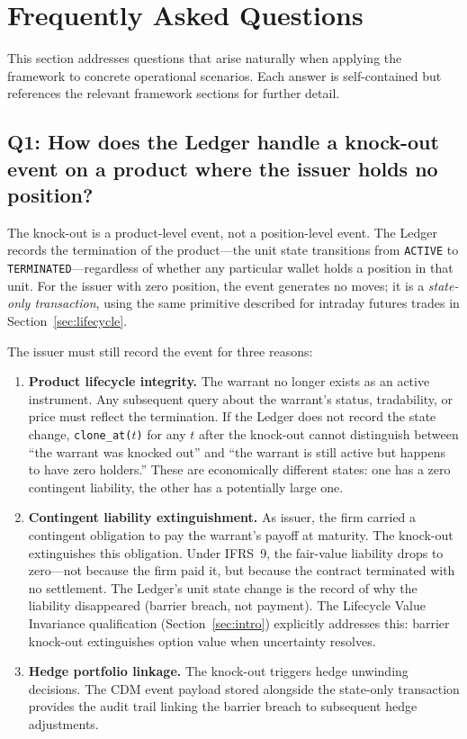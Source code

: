 \documentclass[11pt,a4paper]{article}
\begin{document}
\clearpage
\section{Frequently Asked Questions}
\label{sec:faq}

This section addresses questions that arise naturally when applying the framework to concrete operational scenarios. Each answer is self-contained but references the relevant framework sections for further detail.

\subsection*{Q1: How does the Ledger handle a knock-out event on a product where the issuer holds no position?}

The knock-out is a product-level event, not a position-level event. The Ledger records the termination of the product---the unit state transitions from \texttt{ACTIVE} to \texttt{TERMINATED}---regardless of whether any particular wallet holds a position in that unit. For the issuer with zero position, the event generates no moves; it is a \emph{state-only transaction}, using the same primitive described for intraday futures trades in Section~\ref{sec:lifecycle}.

The issuer must still record the event for three reasons:

\begin{enumerate}[nosep]
\item \textbf{Product lifecycle integrity.} The warrant no longer exists as an active instrument. Any subsequent query about the warrant's status, tradability, or price must reflect the termination. If the Ledger does not record the state change, \texttt{clone\_at($t$)} for any $t$ after the knock-out cannot distinguish between ``the warrant was knocked out'' and ``the warrant is still active but happens to have zero holders.'' These are economically different states: one has a zero contingent liability, the other has a potentially large one.

\item \textbf{Contingent liability extinguishment.} As issuer, the firm carried a contingent obligation to pay the warrant's payoff at maturity. The knock-out extinguishes this obligation. Under IFRS~9, the fair-value liability drops to zero---not because the firm paid it, but because the contract terminated with no settlement. The Ledger's unit state change is the record of why the liability disappeared (barrier breach, not payment). The Lifecycle Value Invariance qualification (Section~\ref{sec:intro}) explicitly addresses this: barrier knock-out extinguishes option value when uncertainty resolves.

\item \textbf{Hedge portfolio linkage.} The knock-out triggers hedge unwinding decisions. The CDM event payload stored alongside the state-only transaction provides the audit trail linking the barrier breach to subsequent hedge adjustments.
\end{enumerate}
\end{document}
